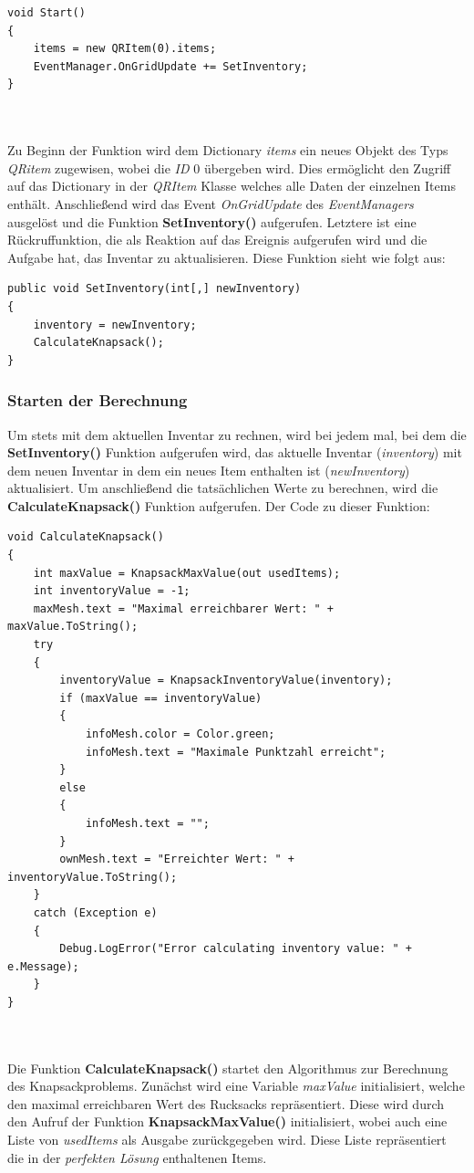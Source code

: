 \begin{lstlisting}[style=csharp, caption={Klassenvariablen der InventoryController Klasse}, label=code:kn_start]
void Start()
{
    items = new QRItem(0).items;
    EventManager.OnGridUpdate += SetInventory;
}
\end{lstlisting}\\
\\
Zu Beginn der Funktion wird dem Dictionary \textit{items} ein neues Objekt des Typs \textit{QRitem} zugewisen, wobei die
\textit{ID} 0 übergeben wird. Dies ermöglicht den Zugriff auf das Dictionary in der \textit{QRItem} Klasse welches alle
Daten der einzelnen Items enthält. Anschließend wird das Event \textit{OnGridUpdate} des \textit{EventManagers} ausgelöst
und die Funktion \textbf{SetInventory()} aufgerufen. Letztere ist eine Rückruffunktion, die als Reaktion auf das Ereignis
aufgerufen wird und die Aufgabe hat, das Inventar zu aktualisieren. Diese Funktion sieht wie folgt aus:
\begin{lstlisting}[style=csharp, caption={Inventar setzen}, label=code:kn_start]
public void SetInventory(int[,] newInventory)
{
    inventory = newInventory;
    CalculateKnapsack();
}
\end{lstlisting}

\subsubsection{Starten der Berechnung}
Um stets mit dem aktuellen Inventar zu rechnen, wird bei jedem mal, bei dem die \textbf{SetInventory()} Funktion
aufgerufen wird, das aktuelle Inventar (\textit{inventory}) mit dem neuen Inventar in dem ein neues Item enthalten ist
(\textit{newInventory}) aktualisiert. Um anschließend die tatsächlichen Werte zu berechnen, wird die \textbf{CalculateKnapsack()}
Funktion aufgerufen. Der Code zu dieser Funktion:
\begin{lstlisting}[style=csharp, caption={Berechnungsfunktion}, label=code:kn_calc]
void CalculateKnapsack()
{
    int maxValue = KnapsackMaxValue(out usedItems);
    int inventoryValue = -1;
    maxMesh.text = "Maximal erreichbarer Wert: " + maxValue.ToString();
    try
    {
        inventoryValue = KnapsackInventoryValue(inventory);
        if (maxValue == inventoryValue)
        {
            infoMesh.color = Color.green;
            infoMesh.text = "Maximale Punktzahl erreicht";
        }
        else
        {
            infoMesh.text = "";
        }
        ownMesh.text = "Erreichter Wert: " + inventoryValue.ToString();
    }
    catch (Exception e)
    {
        Debug.LogError("Error calculating inventory value: " + e.Message);
    }
}
\end{lstlisting}\\
\\
Die Funktion \textbf{CalculateKnapsack()} startet den Algorithmus zur Berechnung des Knapsackproblems. Zunächst wird eine
Variable \textit{maxValue} initialisiert, welche den maximal erreichbaren Wert des Rucksacks repräsentiert. Diese wird
durch den Aufruf der Funktion \textbf{KnapsackMaxValue()} initialisiert, wobei auch eine Liste von \textit{usedItems}
als Ausgabe zurückgegeben wird. Diese Liste repräsentiert die in der \textit{perfekten Lösung} enthaltenen Items.


